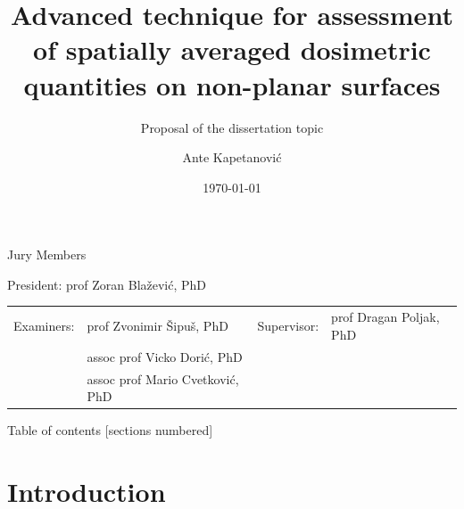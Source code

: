 \documentclass[xcolor=dvipsnames,10pt]{beamer}
\title{Advanced technique for assessment of spatially averaged dosimetric quantities on non-planar surfaces}
\subtitle{Proposal of the dissertation topic}
\author[Ante Kapetanović]{Ante Kapetanović}
\institute{Faculty of Electrical Engineering, Mechanical Engineering and Naval Architecture (FESB)}
\date{\today}
\begin{document}
\begin{frame}[plain]
    \maketitle
    \begin{center}
        \scriptsize{%
            Jury Members\par
            President: prof Zoran Blažević, PhD\par\medskip
            \begin{table}
                \centering
                \begin{tabular}{llll}
                Examiners: & prof Zvonimir Šipuš, PhD & Supervisor: & prof Dragan Poljak, PhD \\
                 & assoc prof Vicko Dorić, PhD &  &  \\
                 & assoc prof Mario Cvetković, PhD &  & 
                \end{tabular}
            \end{table}
        }%
    \end{center}
\end{frame}

\begin{frame}{Table of contents}    
    [sections numbered]
        \tableofcontents
\end{frame}


\section[Introduction]{Introduction}
\end{document}
